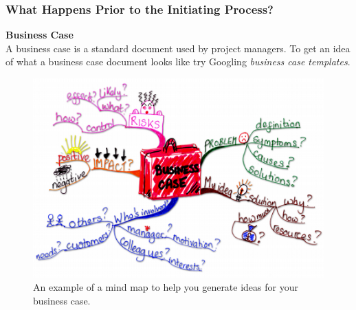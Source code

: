 \documentclass[aspectratio=169]{beamer}
\begin{document}
\begin{frame}
\frametitle{What Happens Prior to the Initiating Process?}
\textbf{Business Case}\\
\vspace{0.2cm}
A business case is a standard document used by project managers. To get an idea of what a business case document looks like try Googling \textit{business case templates}.
\begin{figure}
\includegraphics[scale=0.25]{bus_case}
\caption{An example of a mind map to help you generate ideas for your business case.}
\end{figure}
\end{frame}
\end{document}
